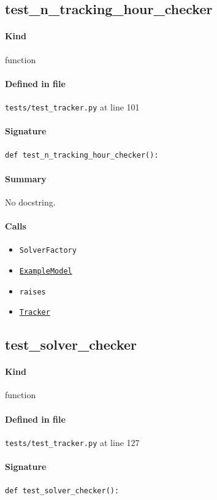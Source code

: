 \documentclass[11pt]{report}
\begin{document}
\subsection{test\_n\_tracking\_hour\_checker}
\label{def:tests-test_tracker.py:test_n_tracking_hour_checker:L101}
\paragraph{Kind} function
\paragraph{Defined in file} \texttt{tests/test\_tracker.py} at line 101
\paragraph{Signature} \texttt{def test\_n\_tracking\_hour\_checker():}
\paragraph{Summary} No docstring.
\paragraph{Calls}
\begin{itemize}[leftmargin=*]
  \item \texttt{SolverFactory}
  \item \hyperref[def:tests-util.py:ExampleModel:L25]{\texttt{ExampleModel}}
  \item \texttt{raises}
  \item \hyperref[def:tracker.py:Tracker:L19]{\texttt{Tracker}}
\end{itemize}
\subsection{test\_solver\_checker}
\label{def:tests-test_tracker.py:test_solver_checker:L127}
\paragraph{Kind} function
\paragraph{Defined in file} \texttt{tests/test\_tracker.py} at line 127
\paragraph{Signature} \texttt{def test\_solver\_checker():}
\end{document}
